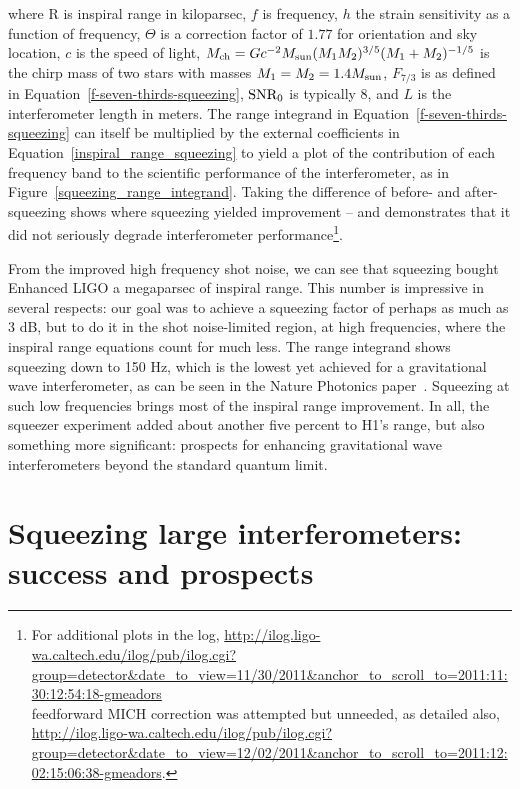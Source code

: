 \noindent where R is inspiral range in kiloparsec, $f$ is frequency, $h$ the strain sensitivity as a function of frequency, $\Theta$ is a correction factor of $1.77$ for orientation and sky location, $c$ is the speed of light, $M_\textup{ch} = G c^{-2} M_\textup{sun} (M_1 M_2)^{3/5} (M_1+M_2)^{-1/5}$ is the chirp mass of two stars with masses $M_1 = M_2 = 1.4 M_\textup{sun}$, $F_{7/3}$ is as defined in Equation~\ref{f-seven-thirds-squeezing}, $\textup{SNR}_0$ is typically 8, and $L$ is the interferometer length in meters.
The range integrand in Equation~\ref{f-seven-thirds-squeezing} can itself be multiplied by the external coefficients in Equation~\ref{inspiral_range_squeezing} to yield a plot of the contribution of each frequency band to the scientific performance of the interferometer, as in Figure~\ref{squeezing_range_integrand}.
Taking the difference of before- and after-squeezing shows where squeezing yielded improvement -- and demonstrates that it did not seriously degrade interferometer performance\footnote{For additional plots in the log, \url{http://ilog.ligo-wa.caltech.edu/ilog/pub/ilog.cgi?group=detector&date_to_view=11/30/2011&anchor_to_scroll_to=2011:11:30:12:54:18-gmeadors}\\feedforward MICH correction was attempted but unneeded, as detailed also, \url{http://ilog.ligo-wa.caltech.edu/ilog/pub/ilog.cgi?group=detector&date_to_view=12/02/2011&anchor_to_scroll_to=2011:12:02:15:06:38-gmeadors}.}.

		From the improved high frequency shot noise, we can see that squeezing bought Enhanced LIGO a megaparsec of inspiral range. 
This number is impressive in several respects: our goal was to achieve a squeezing factor of perhaps as much as 3 dB, but to do it in the shot noise-limited region, at high frequencies, where the inspiral range equations 
 count for much less. 
The range integrand shows squeezing down to 150 Hz, which is the lowest yet achieved for a gravitational wave interferometer, as can be seen in the Nature Photonics paper~\cite{BarsottiNatureSqueezing}.
Squeezing at such low frequencies brings most of the inspiral range improvement.
In all, the squeezer experiment added about another five percent to H1's range, but also something more significant: prospects for enhancing gravitational wave interferometers beyond the standard quantum limit. 

\section{Squeezing large interferometers: success and prospects}
\label{squeezing_success}

